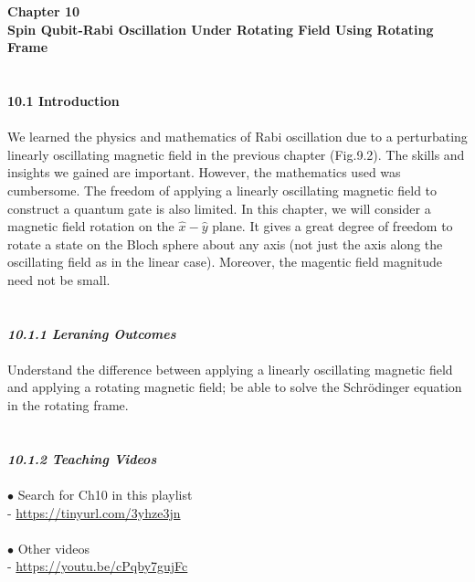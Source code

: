 \documentclass{article}
\newcommand{\bfit}[1]{\textit{\textbf{#1}}}
\begin{document}
\textbf{\Large Chapter 10\\
Spin Qubit-Rabi Oscillation Under Rotating Field Using Rotating Frame}\\\\\\
\textbf{\large 10.1 Introduction}\\\\
We learned the physics and mathematics of Rabi oscillation due to a perturbating linearly
oscillating magnetic field in the previous chapter (Fig.9.2). The skills and insights
we gained are important. However, the mathematics used was cumbersome.
The freedom of applying a linearly oscillating magnetic field to construct a quantum
gate is also limited. In this chapter, we will consider a magnetic field rotation on the
$\hat{x}-\hat{y}$ plane. It gives a great degree of freedom to rotate a state on the Bloch
sphere about any axis (not just the axis along the oscillating field as in the linear case).
Moreover, the magentic field magnitude need not be small.\\\\\\
\bfit{\large 10.1.1 Leraning Outcomes}\\\\
Understand the difference between applying a linearly oscillating magnetic field and applying
a rotating magnetic field; be able to solve the Schr\"{o}dinger equation in the rotating frame.\\\\\\
\bfit{\large 10.1.2 Teaching Videos}\\\\
$\bullet$ Search for Ch10 in this playlist\\

- \url{https://tinyurl.com/3yhze3jn}\\\\
$\bullet$ Other videos\\

- \url{https://youtu.be/cPqby7gujFc}\\
\end{document}
